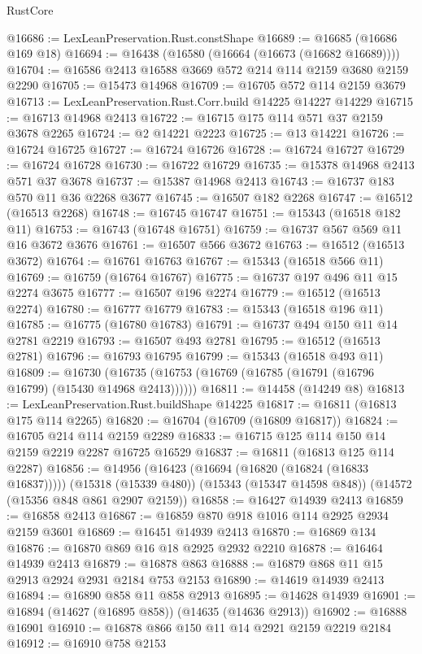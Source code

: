 \begin{lexlean}{RustCore}
\begin{coremodule}
@16686 := LexLeanPreservation.Rust.constShape
@16689 := @16685 (@16686 @169 @18)
@16694 := @16438 (@16580 (@16664 (@16673 (@16682 @16689))))
@16704 := @16586 @2413 @16588 @3669 @572 @214 @114 @2159 @3680 @2159 @2290
@16705 := @15473 @14968
@16709 := @16705 @572 @114 @2159 @3679
@16713 := LexLeanPreservation.Rust.Corr.build @14225 @14227 @14229
@16715 := @16713 @14968 @2413
@16722 := @16715 @175 @114 @571 @37 @2159 @3678 @2265
@16724 := @2 @14221 @2223
@16725 := @13 @14221
@16726 := @16724 @16725
@16727 := @16724 @16726
@16728 := @16724 @16727
@16729 := @16724 @16728
@16730 := @16722 @16729
@16735 := @15378 @14968 @2413 @571 @37 @3678
@16737 := @15387 @14968 @2413
@16743 := @16737 @183 @570 @11 @36 @2268 @3677
@16745 := @16507 @182 @2268
@16747 := @16512 (@16513 @2268)
@16748 := @16745 @16747
@16751 := @15343 (@16518 @182 @11)
@16753 := @16743 (@16748 @16751)
@16759 := @16737 @567 @569 @11 @16 @3672 @3676
@16761 := @16507 @566 @3672
@16763 := @16512 (@16513 @3672)
@16764 := @16761 @16763
@16767 := @15343 (@16518 @566 @11)
@16769 := @16759 (@16764 @16767)
@16775 := @16737 @197 @496 @11 @15 @2274 @3675
@16777 := @16507 @196 @2274
@16779 := @16512 (@16513 @2274)
@16780 := @16777 @16779
@16783 := @15343 (@16518 @196 @11)
@16785 := @16775 (@16780 @16783)
@16791 := @16737 @494 @150 @11 @14 @2781 @2219
@16793 := @16507 @493 @2781
@16795 := @16512 (@16513 @2781)
@16796 := @16793 @16795
@16799 := @15343 (@16518 @493 @11)
@16809 := @16730 (@16735 (@16753 (@16769 (@16785 (@16791 (@16796 @16799) (@15430 @14968 @2413))))))
@16811 := @14458 (@14249 @8)
@16813 := LexLeanPreservation.Rust.buildShape @14225
@16817 := @16811 (@16813 @175 @114 @2265)
@16820 := @16704 (@16709 (@16809 @16817))
@16824 := @16705 @214 @114 @2159 @2289
@16833 := @16715 @125 @114 @150 @14 @2159 @2219 @2287 @16725 @16529
@16837 := @16811 (@16813 @125 @114 @2287)
@16856 := @14956
    (@16423 (@16694 (@16820 (@16824 (@16833 @16837)))))
    (@15318 (@15339 @480))
    (@15343 (@15347 @14598 @848))
    (@14572 (@15356 @848 @861 @2907 @2159))
@16858 := @16427 @14939 @2413
@16859 := @16858 @2413
@16867 := @16859 @870 @918 @1016 @114 @2925 @2934 @2159 @3601
@16869 := @16451 @14939 @2413
@16870 := @16869 @134
@16876 := @16870 @869 @16 @18 @2925 @2932 @2210
@16878 := @16464 @14939 @2413
@16879 := @16878 @863
@16888 := @16879 @868 @11 @15 @2913 @2924 @2931 @2184 @753 @2153
@16890 := @14619 @14939 @2413
@16894 := @16890 @858 @11 @858 @2913
@16895 := @14628 @14939
@16901 := @16894 (@14627 (@16895 @858)) (@14635 (@14636 @2913))
@16902 := @16888 @16901
@16910 := @16878 @866 @150 @11 @14 @2921 @2159 @2219 @2184
@16912 := @16910 @758 @2153

\end{coremodule}
\end{lexlean}
